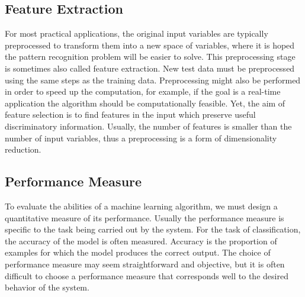 \documentclass{scrartcl}
\begin{document}


\subsection{Feature Extraction}

For most practical applications, the original input variables are typically preprocessed to transform them into a new space of variables, where it is hoped the pattern recognition problem will be easier to solve. This preprocessing stage is sometimes also called feature extraction. New test data must be preprocessed using the same steps as the training data. Preprocessing might also be performed in order to speed up the computation, for example, if the goal is a real-time application the algorithm should be computationally feasible. Yet, the aim of feature selection is to find features in the input which preserve useful discriminatory information. Usually, the number of features is smaller than the number of input variables, thus a preprocessing is a form of dimensionality reduction. 




\subsection{Performance Measure}

To evaluate the abilities of a machine learning algorithm, we must design a quantitative measure of its performance. Usually the performance measure is specific to the task being carried out by the system. For the task of classification, the accuracy of the model is often measured. Accuracy is the proportion of examples for which the model produces the correct output. The choice of performance measure may seem straightforward and objective, but it is often difficult to choose a performance measure that corresponds well to the desired behavior of the system. 
\end{document}
